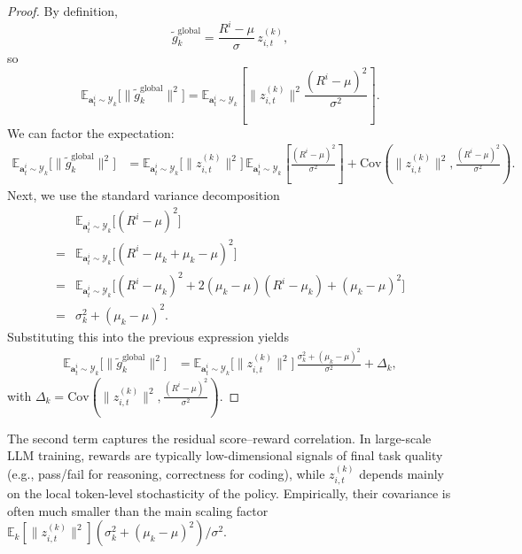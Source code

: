 \begin{proof}
By definition,
\[
    \tilde{g}_k^{\mathrm{global}}
    = \frac{R^i - \mu}{\sigma}\, z_{i,t}^{(k)},
\]
so
\begin{equation}
    \mathbb{E}_{\bm{a}_t^i\sim \mathcal{Y}_k}\big[\|\tilde{g}_k^{\mathrm{global}}\|^2\big]
    = \mathbb{E}_{\bm{a}_t^i\sim \mathcal{Y}_k}\left[
        \|z_{i,t}^{(k)}\|^2 \frac{(R^i-\mu)^2}{\sigma^2}
      \right].
\end{equation}
We can factor the expectation:
\begin{align}
    \mathbb{E}_{\bm{a}_t^i\sim \mathcal{Y}_k}\big[\|\tilde{g}_k^{\mathrm{global}}\|^2\big]
    &= \mathbb{E}_{\bm{a}_t^i\sim \mathcal{Y}_k}\big[\|z_{i,t}^{(k)}\|^2\big]\,
       \mathbb{E}_{\bm{a}_t^i\sim \mathcal{Y}_k}\left[\frac{(R^i-\mu)^2}{\sigma^2}\right] + \mathrm{Cov}(\|z_{i,t}^{(k)}\|^2,\frac{(R^i-\mu)^2}{\sigma^2}).
\end{align}
Next, we use the standard variance decomposition
\begin{align}
    &\mathbb{E}_{\bm{a}_t^i\sim \mathcal{Y}_k}\big[(R^i - \mu)^2\big] \\
    = &\mathbb{E}_{\bm{a}_t^i\sim \mathcal{Y}_k}\big[(R^i - \mu_k + \mu_k - \mu)^2\big] \\
    = &\mathbb{E}_{\bm{a}_t^i\sim \mathcal{Y}_k}\big[(R^i - \mu_k)^2 + 2(\mu_k - \mu)(R^i - \mu_k) + (\mu_k - \mu)^2\big] \\
    = &\sigma^2_k + (\mu_k-\mu)^2.
\end{align}
Substituting this into the previous expression yields
\begin{align}
    \mathbb{E}_{\bm{a}_t^i\sim \mathcal{Y}_k}\big[\|\tilde{g}_k^{\mathrm{global}}\|^2\big]
    &= \mathbb{E}_{\bm{a}_t^i\sim \mathcal{Y}_k}\big[\|z_{i,t}^{(k)}\|^2\big]\,
       \frac{\sigma^2_k + (\mu_k-\mu)^2}{\sigma^2} + \Delta_k,
\end{align}
with $\Delta_k=\mathrm{Cov}(\|z_{i,t}^{(k)}\|^2,\frac{(R^i-\mu)^2}{\sigma^2})$.
\end{proof}
The second term captures the residual score–reward correlation. In large-scale LLM training, rewards are typically low-dimensional signals of final task quality (e.g., pass/fail for reasoning, correctness for coding), while $z_{i,t}^{(k)}$ depends mainly on the local token-level stochasticity of the policy. Empirically, their covariance is
often much smaller than the main scaling factor $\mathbb{E}_k[\|z_{i,t}^{(k)}\|^2](\sigma_k^2 + (\mu_k - \mu)^2)/\sigma^2$.


